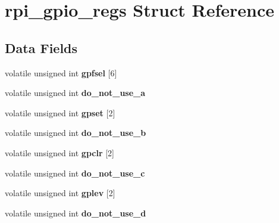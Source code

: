 \hypertarget{structrpi__gpio__regs}{\section{rpi\-\_\-gpio\-\_\-regs Struct Reference}
\label{structrpi__gpio__regs}
}
\subsection*{Data Fields}
\begin{DoxyCompactItemize}
\item 
\hypertarget{structrpi__gpio__regs_afda82a11ac56c66b01ea887389d18a26}{volatile unsigned int {\bfseries gpfsel} \mbox{[}6\mbox{]}}\label{structrpi__gpio__regs_afda82a11ac56c66b01ea887389d18a26}

\item 
\hypertarget{structrpi__gpio__regs_aa19aac77e7f3269d606cf2b60bace895}{volatile unsigned int {\bfseries do\-\_\-not\-\_\-use\-\_\-a}}\label{structrpi__gpio__regs_aa19aac77e7f3269d606cf2b60bace895}

\item 
\hypertarget{structrpi__gpio__regs_aaf858d93d6b445ba8d2cf552ed28523d}{volatile unsigned int {\bfseries gpset} \mbox{[}2\mbox{]}}\label{structrpi__gpio__regs_aaf858d93d6b445ba8d2cf552ed28523d}

\item 
\hypertarget{structrpi__gpio__regs_ab24f2bf9009380b61629795b40df4029}{volatile unsigned int {\bfseries do\-\_\-not\-\_\-use\-\_\-b}}\label{structrpi__gpio__regs_ab24f2bf9009380b61629795b40df4029}

\item 
\hypertarget{structrpi__gpio__regs_aa4ce2ec5dfa1f813c508a6939554b6e5}{volatile unsigned int {\bfseries gpclr} \mbox{[}2\mbox{]}}\label{structrpi__gpio__regs_aa4ce2ec5dfa1f813c508a6939554b6e5}

\item 
\hypertarget{structrpi__gpio__regs_adb2fb944558249e81e99113aad7e1602}{volatile unsigned int {\bfseries do\-\_\-not\-\_\-use\-\_\-c}}\label{structrpi__gpio__regs_adb2fb944558249e81e99113aad7e1602}

\item 
\hypertarget{structrpi__gpio__regs_ad9e2fa9062091fbeeae3c8048174e7a9}{volatile unsigned int {\bfseries gplev} \mbox{[}2\mbox{]}}\label{structrpi__gpio__regs_ad9e2fa9062091fbeeae3c8048174e7a9}

\item 
\hypertarget{structrpi__gpio__regs_ad8d8f3c07708e9f533a582d31eedee80}{volatile unsigned int {\bfseries do\-\_\-not\-\_\-use\-\_\-d}}\label{structrpi__gpio__regs_ad8d8f3c07708e9f533a582d31eedee80}


\end{DoxyCompactItemize}
